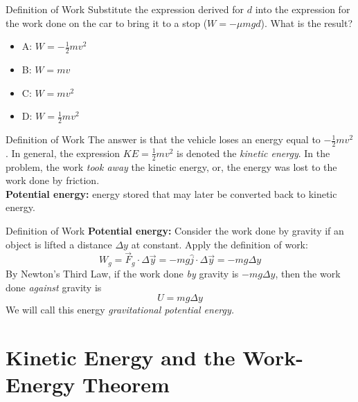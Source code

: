 \documentclass{beamer}
\begin{document}
\begin{frame}{Definition of Work}
Substitute the expression derived for $d$ into the expression for the work done on the car to bring it to a stop ($W = -\mu m g d$).  What is the result?
\begin{itemize}
\item A: $W = -\frac{1}{2} m v^2$
\item B: $W = mv$
\item C: $W = mv^2$
\item D: $W = \frac{1}{2} m v^2$
\end{itemize}
\end{frame}

\begin{frame}{Definition of Work}
The answer is that the vehicle loses an energy equal to $-\frac{1}{2}mv^2$.  In general, the expression $KE = \frac{1}{2}mv^2$ is denoted the \textit{kinetic energy}.  In the problem, the work \textit{took away} the kinetic energy, or, the energy was lost to the work done by friction. \\ \vspace{1cm}
\textbf{Potential energy:} energy stored that may later be converted back to kinetic energy.
\end{frame}

\begin{frame}{Definition of Work}
\textbf{Potential energy:}
Consider the work done by gravity if an object is lifted a distance $\Delta y$ at constant.  Apply the definition of work:
\begin{equation}
W_g = \vec{F}_g \cdot \Delta \vec{y} = -mg \hat{j} \cdot \Delta \vec{y} = -mg\Delta y
\end{equation}
By Newton's Third Law, if the work done \textit{by} gravity is $-mg\Delta y$, then the work done \textit{against} gravity is
\begin{equation}
U = m g \Delta y
\end{equation}
We will call this energy \textit{gravitational potential energy.}
\end{frame}

\section{Kinetic Energy and the Work-Energy Theorem}
\end{document}
